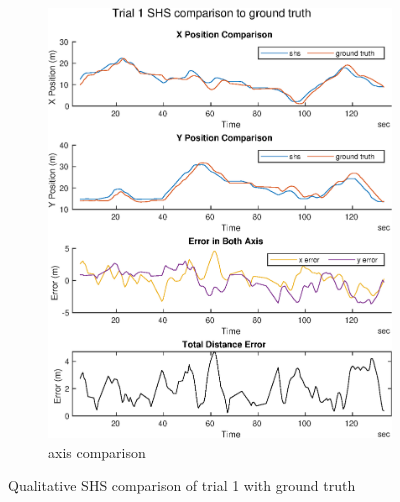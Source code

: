 \begin{figure}[H]
\begin{subfigure}[t]{.45\textwidth}
		\includegraphics[width=\linewidth]{images/20201029_1040_trial1_shs_2}
		\caption{axis comparison}
		\label{fig:trial1_comparison}
	\end{subfigure}
	\caption{Qualitative SHS comparison of trial 1 with ground truth}
	\label{fig:trial1_shs_gt_comparison}
\end{figure}
